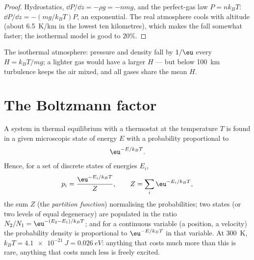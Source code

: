 \begin{proof}
Hydrostatics, $\dd P/\dd z = -\rho g = -nmg$, and the perfect-gas law $P
= nk_BT$: $\dd P/\dd z = -(mg/k_BT)P$, an exponential. The real
atmosphere cools with altitude (about \qty{6.5}{K/km} in the lowest ten
kilometres), which makes the fall somewhat faster; the isothermal
model is good to $20\%$.
\end{proof}

\begin{omfigure}

{\small The isothermal atmosphere: pressure and density fall by $1/\eu$
every  $H = k_BT/mg$; a lighter gas would have a larger $H$
--- but below \qty{100}{km} turbulence keeps the air mixed, and all
gases share the mean $H$.}
\end{omfigure}

\section{The Boltzmann factor}

\begin{theorem}\label{thm:b2:boltzmann-factor:factor}
A system in thermal equilibrium with a thermostat at the temperature
$T$ is found in a given microscopic state of energy $E$ with a
probability proportional to
\[
\eu^{-E/k_BT} .
\]
Hence, for a set of discrete states of energies $E_i$,
\[
p_i = \frac{\eu^{-E_i/k_BT}}{Z}, \qquad Z = \sum_i\eu^{-E_i/k_BT} ,
\]
the sum $Z$ (the \emph{partition function})
normalising the probabilities; two states (or two levels of equal
degeneracy) are populated in the ratio $N_2/N_1 = \eu^{-(E_2 - E_1)/k_BT}$;
and for a continuous variable (a position, a velocity) the probability
density is proportional to $\eu^{-E/k_BT}$ in that variable. At
\qty{300}{K}, $k_BT = \qty{4.1e-21}{J} = \qty{0.026}{eV}$: anything that
costs much more than this is rare, anything that costs much less is
freely excited.
\end{theorem}

